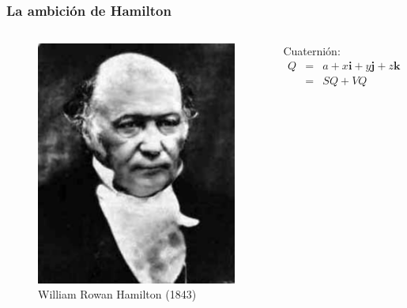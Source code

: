 \documentclass{beamer}
\begin{document}
\begin{frame}
    \frametitle{La ambición de Hamilton}
    \begin{columns}
        \begin{center}
            \begin{figure}
            \includegraphics[scale=0.4]{../gfx/hamilton}
                \caption{William Rowan Hamilton (1843)}
            \end{figure}
        \end{center}
       Cuaternión:
       \begin{eqnarray*}
           Q &=& a + x\bm{i} + y\bm{j} + z\bm{k} \\
             &=& SQ + VQ
       \end{eqnarray*}
    \end{columns}
\end{frame}
\end{document}

